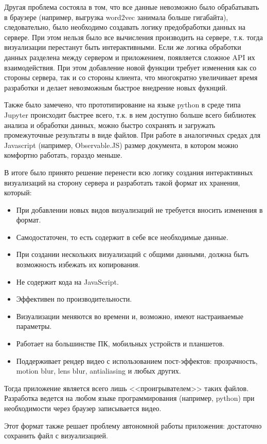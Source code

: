 Другая проблема состояла в том, что все данные невозможно было обрабатывать в браузере (например, выгрузка word2vec занимала больше гигабайта), следовательно, было необходимо создавать логику предобработки данных на сервере. При этом нельзя было все вычисления производить на сервере, т.к. тогда визуализации перестанут быть интерактивными. Если же логика обработки данных разделена между сервером и приложением, появляется сложное API их взаимодействия. При этом добавление новой функции требует изменения как со стороны сервера, так и со стороны клиента, что многократно увеличивает время разработки и делает невозможным быстрое внедрение новых фукнций.

Также было замечено, что прототипирование на языке python в среде типа Jupyter происходит быстрее всего, т.к. в нем доступно больше всего библиотек анализа и обработки данных, можно быстро сохранять и загружать промежуточные результаты в виде файлов. При работе в аналогичных средах для Javascript (например, Observable.JS) размер документа, в котором можно комфортно работать, гораздо меньше.

В итоге было принято решение перенести всю логику создания интерактивных визуализаций на сторону сервера и разработать такой формат их хранения, который:
\begin{itemize}
\item При добавлении новых видов визуализаций не требуется вносить изменения в формат.
\item Самодостаточен, то есть содержит в себе все необходимые данные.
\item При создании нескольких визуализаций с общими данными, должна быть возможность избежать их копирования.
\item Не содержит кода на JavaScript.
\item Эффективен по производительности.
\item Визуализации меняются во времени и, возможно, имеют настраиваемые параметры.
\item Работает на большинстве ПК, мобильных устройств и планшетов.
\item Поддерживает рендер видео с использованием пост-эффектов: прозрачность, motion blur, lens blur, antialiasing и любых других.
\end{itemize}
Тогда приложение является всего лишь <<проигрывателем>> таких файлов. Разработка ведется на любом языке программирования (например, python) при необходимости через браузер записывается видео.

Этот формат также решает проблему автономной работы приложения: достаточно сохранить файл с визуализацией.

